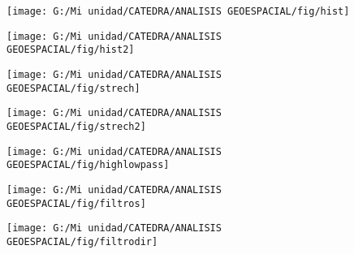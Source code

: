 \documentclass[14pt]{beamer}
\begin{document}
\begin{frame}
  \begin{figure}
    \centering
    \texttt{[image: G:/Mi unidad/CATEDRA/ANALISIS GEOESPACIAL/fig/hist]}
  \end{figure}
\tiny{}
\end{frame}
\begin{frame}
  \begin{figure}
    \centering
    \texttt{[image: G:/Mi unidad/CATEDRA/ANALISIS GEOESPACIAL/fig/hist2]}
  \end{figure}
\tiny{}
\end{frame}
\begin{frame}
  \begin{figure}
    \centering
    \texttt{[image: G:/Mi unidad/CATEDRA/ANALISIS GEOESPACIAL/fig/strech]}
  \end{figure}
\tiny{}
\end{frame}
\begin{frame}
  \begin{figure}
    \centering
    \texttt{[image: G:/Mi unidad/CATEDRA/ANALISIS GEOESPACIAL/fig/strech2]}
  \end{figure}
\tiny{}
\end{frame}
\begin{frame}
  \begin{figure}
    \centering
    \texttt{[image: G:/Mi unidad/CATEDRA/ANALISIS GEOESPACIAL/fig/highlowpass]}
  \end{figure}
\tiny{}
\end{frame}
\begin{frame}
  \begin{figure}
    \centering
    \texttt{[image: G:/Mi unidad/CATEDRA/ANALISIS GEOESPACIAL/fig/filtros]}
  \end{figure}
\tiny{}
\end{frame}
\begin{frame}
  \begin{figure}
    \centering
    \texttt{[image: G:/Mi unidad/CATEDRA/ANALISIS GEOESPACIAL/fig/filtrodir]}
  \end{figure}
\tiny{}
\end{frame}
\end{document}

